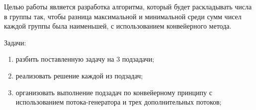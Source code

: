 
Целью работы является разработка алгоритма, который будет раскладывать числа в группы так, чтобы разница максимальной и минимальной среди сумм чисел каждой группы была наименьшей, с использованием конвейерного метода.

Задачи:
\begin{enumerate}[label={\arabic*)}]
	\item разбить поставленную задачу на 3 подзадачи;
	\item реализовать решение каждой из подзадач;
	\item организовать выполнение подзадач по конвейерному принципу с использованием потока-генератора и трех дополнительных потоков;
\end{enumerate}

\clearpage
